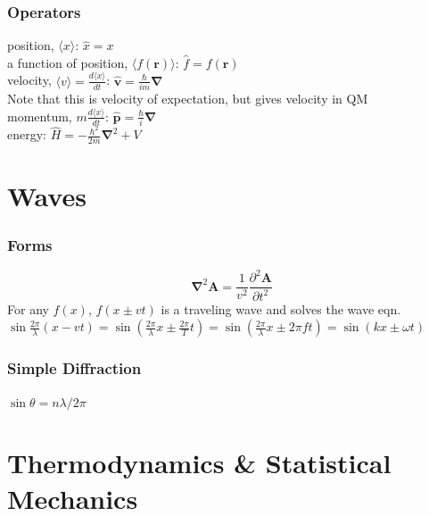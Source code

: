 \documentclass[letterpaper,landscape,10pt]{article}
\begin{document}
{\begin{multicols}{4}
  \subsubsection*{Operators}
  	\hspace{5pt}position, $\langle x \rangle$: $\hat{x} = x$ \\
	\hspace{5pt}a function of position, $\langle f(\bm{r})\rangle$: $\hat{f}=f(\bm{r})$ \\
	\hspace{5pt}velocity, $\langle v\rangle=\frac{d\langle x \rangle}{dt}$: $\hat{\bm{v}} = \frac{\hbar}{im}\bm\nabla$ \\
	\hspace{10pt}Note that this is velocity of expectation, but gives velocity in QM\\
	\hspace{5pt}momentum, $m\frac{d\langle x \rangle}{dt}$: $\hat{\bm{p}}=\frac{\hbar}{i}\bm\nabla$ \\
	\hspace{5pt}energy: $\hat H = -\frac{\hbar^2}{2m}\bm\nabla^2+V$

\section*{Waves}
  \subsubsection*{Forms}
	  $$ \bm\nabla^2 \bm A = \frac{1}{v^2} \frac{\partial^2 \bm A}{\partial t^2} $$
	For any $f(x)$, $f(x\pm vt)$ is a traveling wave and solves the wave eqn.\\
	$\sin\frac{2\pi}{\lambda}\left( x-vt \right) =
		\sin\left( \frac{2\pi}{\lambda}x \pm \frac{2\pi}{T}t \right) =
		\sin\left( \frac{2\pi}{\lambda}x \pm 2\pi f t \right) = 
		\sin\left( kx\pm \omega t \right)$
  \subsubsection*{Simple Diffraction}
	  \hspace{5pt}$\sin\theta = n\lambda/2\pi$

\section*{Thermodynamics \& Statistical Mechanics}

\end{multicols}}
\end{document}
